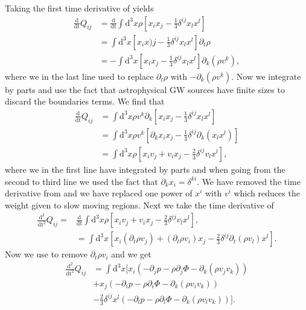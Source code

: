 Taking the first time derivative of  yields
\begin{align} \label{eqT:quaddt}
\frac{\mathrm{d}}{\mathrm{dt}}Q_{ij} &=  \frac{\mathrm{d}}{\mathrm{dt}} 
\int \mathrm{d}^3 x \rho\left [x_i x_j - \frac{1}{3} \delta^{ij} x_l x^l \right ] \nonumber \\ 
& = \int \mathrm{d}^3 x \left [x_i x)j - \frac{1}{3} \delta^{ij} x_l x^l \right ] \partial_t \rho \nonumber \\
& = -\int \mathrm{d}^3 x \left [x_i x_j - \frac{1}{3} \delta^{ij} x_l x^l \right ] \partial_k (\rho v^k),
\end{align}
where we in the last line used  to replace $\partial_t \rho$ with $-\partial_k (\rho v^k)$.
Now we integrate  by parts and use the fact that astrophysical GW sources have finite sizes 
to discard the boundaries terms. We find that
\begin{align} \label{eqT:quaddt2}
\frac{\mathrm{d}}{\mathrm{dt}}Q_{ij} &= \int \mathrm{d}^3 x \rho  v^k \partial_k \left [x_i x_j - \frac{1}{3} \delta^{ij} x_l x^l \right ] \nonumber \\
&= \int \mathrm{d}^3 x \rho v^k \left  [\partial_k x_i x_j - \frac{1}{3} \delta^{ij} \partial_k (x_l x^l) \right ] \nonumber \\
&= \int \mathrm{d}^3 x \rho \left [x_i v_j + v_i x_j - \frac{2}{3} \delta^{ij} v_l x^l \right ],
\end{align}
where we in the first line have integrated by parts and when going from the second to third line we used the fact that
$\partial_k x_i = \delta^{ki}$. We have removed the time derivative from  and we have replaced one
power of $x^i$ with $v^i$ which reduces the weight given to slow moving regions.
Next we take the time derivative of 
\begin{align} \label{eqT:quaddtt}
\frac{\mathrm{d}^2}{\mathrm{dt}^2}Q_{ij} =& \frac{\mathrm{d}}{\mathrm{dt}} \int \mathrm{d}^3 x \rho \left  
[x_i v_j + v_i x_j - \frac{2}{3} \delta^{ij} v_l x^l \right ], \nonumber \\
& = \int \mathrm{d}^3 x \left [x_i (\partial_t \rho v_j) +  (\partial_t \rho v_i) x_j - \frac{2}{3} \delta^{ij} \partial_t ( \rho v_l) x^l \right ].
\end{align}
Now we use  to remove $\partial_t \rho v_i$ and we get
\begin{align} \label{eqT:quaddtt2}
\frac{\mathrm{d}^2}{\mathrm{dt}^2} Q_{ij} & = \int \mathrm{d}^3 x \bigg[ x_i (-\partial_j p - \rho \partial_j \Phi - \partial_k (\rho v_j v_k)) \nonumber \\
&+ x_j (-\partial_i p - \rho \partial_i \Phi - \partial_k (\rho v_i v_k)) \nonumber \\
&- \frac{2}{3} \delta^{ij} x^l (-\partial_l p - \rho \partial_l \Phi - \partial_k (\rho v_l v_k)) \bigg].
\end{align}
